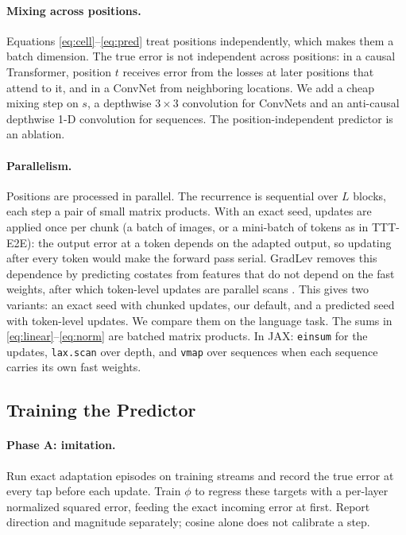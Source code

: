 \documentclass{article}
\begin{document}
\paragraph{Mixing across positions.} Equations
\eqref{eq:cell}--\eqref{eq:pred} treat positions independently, which makes
them a batch dimension. The true error is not independent across positions: in
a causal Transformer, position $t$ receives error from the losses at later
positions that attend to it, and in a ConvNet from neighboring locations. We
add a cheap mixing step on $s$, a depthwise $3\times 3$ convolution for
ConvNets and an anti-causal depthwise 1-D convolution for sequences. The
position-independent predictor is an ablation.

\paragraph{Parallelism.} Positions are processed in parallel. The recurrence is
sequential over $L$ blocks, each step a pair of small matrix products. With an
exact seed, updates are applied once per chunk (a batch of images, or a
mini-batch of tokens as in TTT-E2E): the output error at a token depends on the
adapted output, so updating after every token would make the forward pass
serial. GradLev removes this dependence by predicting costates from features
that do not depend on the fast weights, after which token-level updates are
parallel scans \parencite{liu2026gradlev}. This gives two variants: an exact
seed with chunked updates, our default, and a predicted seed with token-level
updates. We compare them on the language task. The sums in \eqref{eq:linear}--\eqref{eq:norm} are batched matrix
products. In JAX: \texttt{einsum} for the updates, \texttt{lax.scan} over
depth, and \texttt{vmap} over sequences when each sequence carries its own fast
weights.

\subsection{Training the Predictor}

\paragraph{Phase A: imitation.} Run exact adaptation episodes on training
streams and record the true error at every tap before each update. Train
$\phi$ to regress these targets with a per-layer normalized squared error,
feeding the exact incoming error at first. Report direction and magnitude
separately; cosine alone does not calibrate a step.
\end{document}
